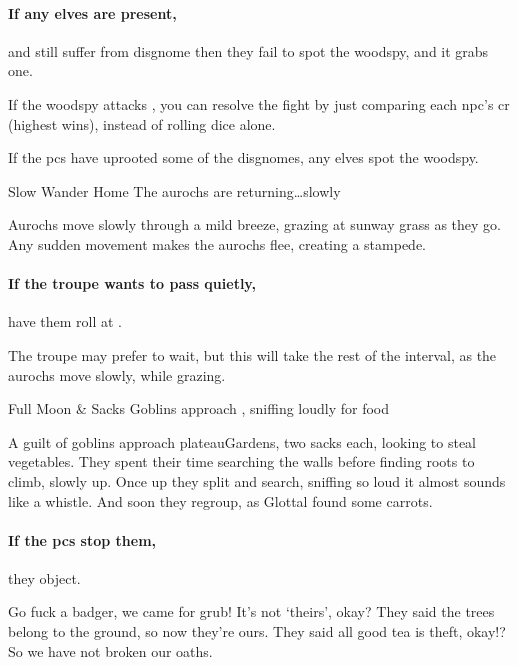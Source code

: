 \paragraph{If any elves are present,}
and still suffer from \gls{disgnome} then
they fail to spot the \gls{woodspy}, and it grabs one.

If the \gls{woodspy} attacks , you can resolve the fight by just comparing each \gls{npc}'s \gls{cr} (highest wins), instead of rolling dice alone.

If the \glspl{pc} have uprooted some of the \glspl{disgnome}, any elves spot the \gls{woodspy}.

\woodspy

{Slow Wander Home}%
{The aurochs are returning\ldots slowly}%

Aurochs move slowly through a mild breeze, grazing at \gls{sunway} grass as they go.
Any sudden movement makes the aurochs flee, creating a stampede.

\paragraph{If the troupe wants to pass quietly,}
have them roll  at \tn[8].

The troupe may prefer to wait, but this will take the rest of the \gls{interval}, as the aurochs move slowly, while grazing.

{Full Moon \& Sacks}%
{Goblins approach , sniffing loudly for food}%

A guilt of goblins approach \gls{plateauGardens}, two sacks each, looking to steal vegetables.
They spent their time searching the walls before finding roots to climb, slowly up.
Once up they split and search, sniffing so loud it almost sounds like a whistle.
And soon they regroup, as Glottal found some carrots.

\paragraph{If the \glspl{pc} stop them,}
they object.

\begin{speechtext}
  Go fuck a badger, we came for grub!
  It's not `theirs', okay?
  They said the trees belong to the ground, so now they're ours.
  They said all good tea is theft, okay!?
  So we have not broken our oaths.
\end{speechtext}

